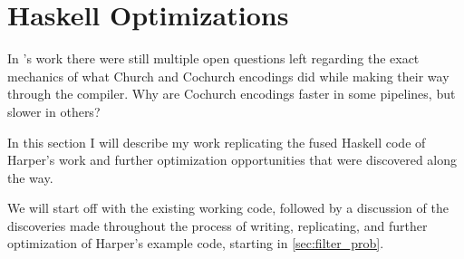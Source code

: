 
\section{Haskell Optimizations}\label{sec:haskell}
In \cite{Harper2011}'s work there were still multiple open questions left regarding the exact mechanics of what Church and Cochurch encodings did while making their way through the compiler. Why are Cochurch encodings faster in some pipelines, but slower in others?

In this section I will describe my work replicating the fused Haskell code of Harper's work and further optimization opportunities that were discovered along the way.

We will start off with the existing working code, followed by a discussion of the discoveries made throughout the process of writing, replicating, and further optimization of Harper's example code, starting in \autoref{sec:filter_prob}.


